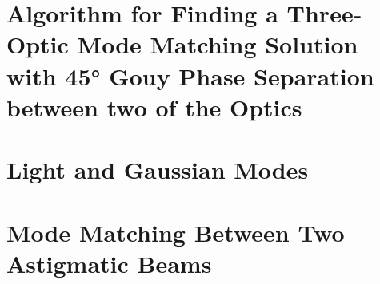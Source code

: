\documentclass[12pt,twoside, openright]{book}
\begin{document}
\chapter{Algorithm for Finding a Three-Optic Mode Matching Solution with 45\si{\degree} Gouy Phase Separation between two of the Optics}
\label{app:mode_matching_algorithm}

\chapter{Light and Gaussian Modes}
\label{chapter:Light_and_Gaussian_Modes}

\chapter{Mode Matching Between Two Astigmatic Beams}
\label{app:mode_matching_algorithm_derivation}

%
%
\setlength{\parskip}{0em}
\printglossary
\printglossary[type=\acronymtype]
\cleardoublepage
{}
{}

\end{document}
